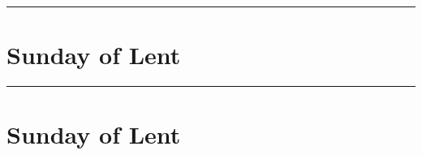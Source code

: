 {{{\def\commemorations{If today is March 18 or 19, \emph{First Vespers of St Joseph} is commemorated as follows.}
\printcommemnote{}
}

\bigskip
\hrule
\medskip
{
\label{stjoseph-commem}
\def\begincollectcols{\begin{parcolumns}[rulebetween,colwidths={1=0.42\linewidth}]{2}}
\def\vrlinebreak{T}

\bigskip
\benedicamusdomino{}
}

{
\section{ Sunday of Lent}
\label{lent3}
\printcommonvespers[1]
\def\postmagtitle{\label{lent3mag}}

\def\commemorations{If today is March 18 or 19, \emph{First Vespers of St Joseph} is commemorated as on page \pageref{stjoseph-commem}.  If today is March 24 or 25, \emph{First Vespers of the Annunciation} is commemorated as follows.}
\printcommemnote{}
}

\bigskip
\hrule
\medskip
{
\label{annunciation-commem}
\def\begincollectcols{\begin{parcolumns}[rulebetween,colwidths={1=0.43\linewidth}]{2}}


\bigskip

\benedicamusdominolentoreaster{}
}

\def\commemorations{If today is March 18 or 19, \emph{First Vespers of St Joseph} is commemorated as on page \pageref{stjoseph-commem}.  If today is March 24 or 25, \emph{First Vespers of the Annunciation} is commemorated as on page \pageref{annunciation-commem}.}
{
\section{ Sunday of Lent}
\label{lent4}
\def\liturgicalcolor{Violet or Rose}
\printcommonvespers[1]
\def\postmagtitle{\label{lent4mag}}

\printcommemnote{}
}

}}

